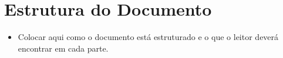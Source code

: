 \section{Estrutura do Documento}
    \begin{itemize}
        \item Colocar aqui como o documento está estruturado e o que o leitor deverá encontrar em cada parte.
    \end{itemize}